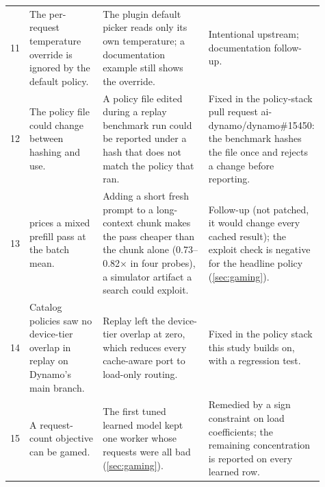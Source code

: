 {\begin{longtable}{@{}P{0.04\linewidth}P{0.26\linewidth}P{0.41\linewidth}P{0.2\linewidth}@{}}
11 & The per-request temperature override is ignored by the default policy. &
  The plugin default picker reads only its own temperature; a documentation example still shows
  the override. & Intentional upstream; documentation follow-up. \\
12 & The policy file could change between hashing and use. &
  A policy file edited during a replay benchmark run could be reported under a hash that does not
  match the policy that ran. & Fixed in the policy-stack pull request
  ai-dynamo/\allowbreak{}dynamo\#15450: the benchmark hashes the file once and rejects a change
  before reporting. \\
13 & \aisim{} prices a mixed prefill pass at the batch mean. &
  Adding a short fresh prompt to a long-context chunk makes the pass cheaper than the chunk alone
  (0.73--0.82$\times$ in four probes), a simulator artifact a search could exploit. &
  Follow-up (not patched, it would change every cached result); the exploit check is negative for
  the headline policy (\cref{sec:gaming}). \\
14 & Catalog policies saw no device-tier overlap in replay on Dynamo's main branch. &
  Replay left the device-tier overlap at zero, which reduces every cache-aware port to load-only
  routing. & Fixed in the policy stack this study builds on, with a regression test. \\
15 & A request-count objective can be gamed. &
  The first tuned learned model kept one worker whose requests were all bad
  (\cref{sec:gaming}). & Remedied by a sign constraint on load coefficients; the remaining
  concentration is reported on every learned row. \\
\end{longtable}
}
